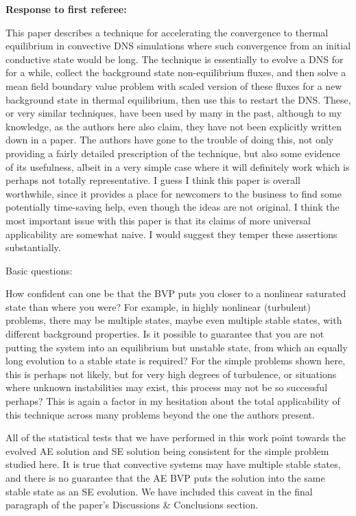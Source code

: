 \documentclass[aps, 11pt, singlecolumn]{revtex4-1} %
\begin{document}
\begin{singlespace}
\newpage
\noindent
\Large{\textbf{Response to first referee:}}\newline$\,$\newline\indent

\begin{myquotation}
This paper describes a technique for accelerating the convergence to
thermal equilibrium in convective DNS simulations where such
convergence from an initial conductive state would be long. The
technique is essentially to evolve a DNS for for a while, collect the
background state non-equilibrium fluxes, and then solve a mean field
boundary value problem with scaled version of these fluxes for a new
background state in thermal equilibrium, then use this to restart the
DNS. These, or very similar techniques, have been used by many in the
past, although to my knowledge, as the authors here also claim, they
have not been explicitly written down in a paper. The authors have
gone to the trouble of doing this, not only providing a fairly
detailed prescription of the technique, but also some evidence of its
usefulness, albeit in a very simple case where it will definitely work
which is perhaps not totally representative. I guess I think this
paper is overall worthwhile, since it provides a place for newcomers
to the business to find some potentially time-saving help, even though
the ideas are not original. I think the most important issue with this
paper is that its claims of more universal applicability are somewhat
naive. I would suggest they temper these assertions substantially.

Basic questions:

How confident can one be that the BVP puts you closer to a nonlinear
saturated state than where you were? For example, in highly nonlinear
(turbulent) problems, there may be multiple states, maybe even
multiple stable states, with different background properties. Is it
possible to guarantee that you are not putting the system into an
equilibrium but unstable state, from which an equally long evolution
to a stable state is required? For the simple problems shown here,
this is perhaps not likely, but for very high degrees of turbulence,
or situations where unknown instabilities may exist, this process may
not be so successful perhaps? This is again a factor in my hesitation
about the total applicability of this technique across many problems
beyond the one the authors present.
\end{myquotation}
All of the statistical tests that we have performed in this work point towards
the evolved AE solution and SE solution being consistent for the simple problem
studied here.
It is true that convective systems may have multiple stable states, and there
is no guarantee that the AE BVP puts the solution into the same stable state as an
SE evolution. We have included this caveat in the final paragraph of the paper's
Discussions \& Conclusions section.
 

\end{singlespace}
\end{document}
